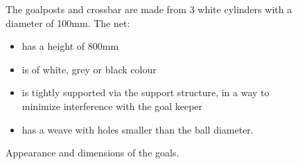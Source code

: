 \begin{figure}[h!]
	\begin{center}
		\leavevmode
		\begin{minipage}[t]{0.49\columnwidth}
		\end{minipage}
		\begin{minipage}[t]{0.49\columnwidth}
			The goalposts and crossbar are made from 3 white cylinders with a diameter of 100mm.
			The net:
			\begin{itemize}
				\item has a height of 800mm
				\item is of white, grey or black colour
				\item is tightly supported via the support structure, in a way to minimize interference with the goal keeper
				\item has a weave with holes smaller than the ball diameter.
			\end{itemize}
		\end{minipage}
		\caption{Appearance and dimensions of the goals.}
		\label{fig:goal_appearance}
	\end{center}
\end{figure}

